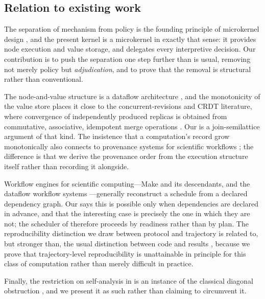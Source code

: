 \documentclass[11pt,a4paper]{article}
\theoremstyle{thmstyle}
\theoremstyle{definition}
\theoremstyle{remark}
\begin{document}
\subsection{Relation to existing work}

The separation of mechanism from policy is the founding principle of
microkernel design \citep{liedtke1995,hansen1970}, and the present kernel is
a microkernel in exactly that sense: it provides node execution and value
storage, and delegates every interpretive decision. Our contribution is to
push the separation one step further than is usual, removing not merely
policy but \emph{adjudication}, and to prove that the removal is structural
rather than conventional.

The node-and-value structure is a dataflow architecture
\citep{dennis1974,kahn1974}, and the monotonicity of the value store places
it close to the concurrent-revisions and CRDT literature, where convergence
of independently produced replicas is obtained from commutative, associative,
idempotent merge operations \citep{shapiro2011}. Our
 is a join-semilattice argument of that kind.
The insistence that a computation's record grow monotonically also connects
to provenance systems for scientific workflows
\citep{davidson2008,moreau2011}; the difference is that we derive the
provenance order from the execution structure itself rather than recording
it alongside.

Workflow engines for scientific computing---Make and its descendants, and
the dataflow workflow systems \citep{koster2012,direct2017}---generally
reconstruct a schedule from a declared dependency graph. Our
 says this is possible only when dependencies are
declared in advance, and that the interesting case is precisely the one in
which they are not; the scheduler of  therefore proceeds
by readiness rather than by plan. The reproducibility distinction we draw
between protocol and trajectory is related to, but stronger than, the usual
distinction between code and results \citep{peng2011,stodden2016}, because
we prove that trajectory-level reproducibility is unattainable in principle
for this class of computation rather than merely difficult in practice.

Finally, the restriction on self-analysis in  is an
instance of the classical diagonal obstruction
\citep{cantor1891,godel1931,tarski1936,lawvere1969}, and we present it as
such rather than claiming to circumvent it.
\end{document}
